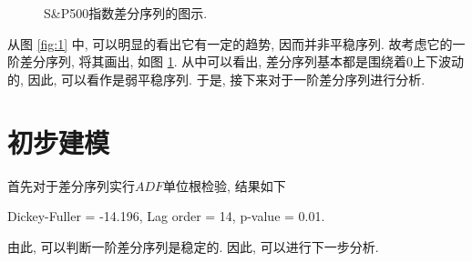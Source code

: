 \documentclass[12pt]{article}
\begin{document}
\begin{center}
\begin{minipage}{0.45\textwidth}
\begin{figure}
            \caption{S\&P500指数差分序列的图示.\label{fig:2}}
        \end{figure}
    \end{minipage}
\end{center}


从图 \ref{fig:1} 中, 可以明显的看出它有一定的趋势, 因而并非平稳序列. 故考虑它的一阶差分序列, 将其画出, 如图 \ref{fig:2}. 从中可以看出, 差分序列基本都是围绕着0上下波动的, 因此, 可以看作是弱平稳序列. 于是, 接下来对于一阶差分序列进行分析. 
\section{初步建模}
\qquad 首先对于差分序列实行$ADF$单位根检验, 结果如下
\begin{center}
    Dickey-Fuller = -14.196, Lag order = 14, p-value = 0.01. 
\end{center}
由此, 可以判断一阶差分序列是稳定的. 因此, 可以进行下一步分析. 
\end{document}
